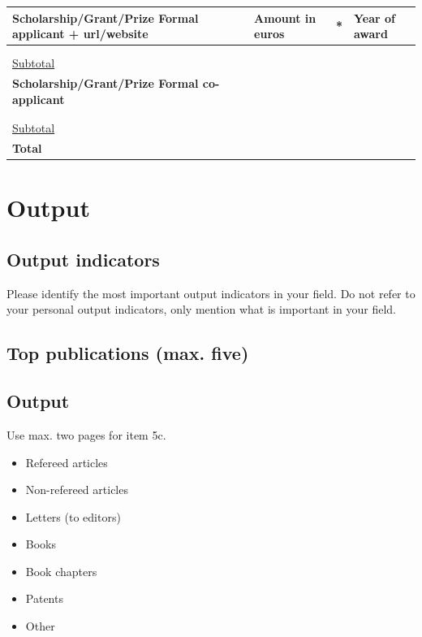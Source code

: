 \documentclass[10pt]{article}
\newcommand{\tableheadfont}{\bfseries\fontsize{10}{10}\selectfont\leavevmode\color{tableblue}}
\begin{document}
	\noindent
	\begin{tabularx}{\linewidth}{|X|X|X|X|}
		\hline
		\tableheadfont Scholarship/Grant/Prize Formal applicant + url/website & \tableheadfont Amount in euros & \tableheadfont * &	\tableheadfont Year of award \\\hline
		& & & \\\hline
		& & & \\\hline
		\color{tableblue} \underline{Subtotal} & & & \\\hline
		\tableheadfont Scholarship/Grant/Prize Formal co-
		applicant & & & \\\hline
		& & & \\\hline
		& & & \\\hline
		\color{tableblue} \underline{Subtotal} & & & \\\hline
		\tableheadfont Total & & & \\\hline		
	\end{tabularx}
	
	\section{Output}
	
	\subsection{Output indicators}
	
	Please identify the most important output indicators in your field. Do not refer to your personal output indicators, only mention what is important in your field. 
	
	\subsection{Top publications (max. five)}
	\vfill 
	
	\subsection{Output}
	Use max. two pages for item 5c. 
	\begin{itemize}[label={--}]
		\color{tableblue}
		\setlength\itemsep{0em}
		\item Refereed articles
		\item Non-refereed articles
		\item Letters (to editors)
		\item Books
		\item Book chapters
		\item Patents
		\item Other
	\end{itemize}
\end{document}
